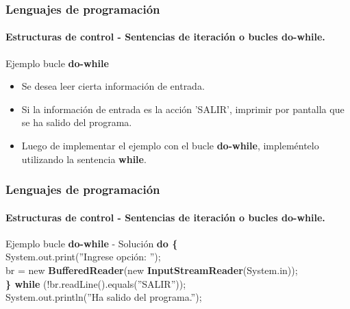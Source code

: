 \documentclass{beamer}
\begin{document}
		\begin{frame}
			\frametitle{Lenguajes de programaci\'on}
			\framesubtitle{Estructuras de control - Sentencias de iteraci\'on o bucles \textbf{do-while}.}

			\begin{block}{Ejemplo bucle \textbf{do-while}}
				\begin{itemize}
					\item Se desea leer cierta informaci\'on de entrada.
					\item Si la informaci\'on de entrada es la acci\'on 'SALIR', imprimir por pantalla que se ha salido del programa.
					\item Luego de implementar el ejemplo con el bucle \textbf{do-while}, implem\'entelo utilizando la sentencia \textbf{while}.
				\end{itemize}
			\end{block}
		\end{frame}

		\begin{frame}
			\frametitle{Lenguajes de programaci\'on}
			\framesubtitle{Estructuras de control - Sentencias de iteraci\'on o bucles \textbf{do-while}.}

			\begin{block}{Ejemplo bucle \textbf{do-while} - Soluci\'on}
				{\scriptsize
				\textbf{do \{}\\
				\hspace{0.3cm} System.out.print(''Ingrese opci\'on: ''); \\
				\hspace{0.3cm} br = new \textbf{BufferedReader}(new \textbf{InputStreamReader}(System.in)); \\
				\textbf{\} while} (!br.readLine().equals(''SALIR'')); \\
				\vspace{0.3cm}
				System.out.println(''Ha salido del programa.''); 
				}
			\end{block}
		\end{frame}
\end{document}
